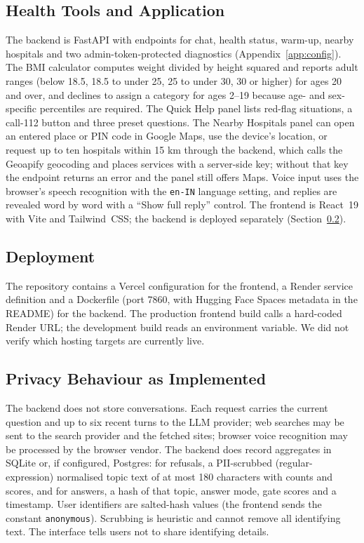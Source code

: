 \documentclass[10pt,a4paper]{article}
\newcommand{\code}[1]{\texttt{\small #1}}
\begin{document}
\subsection{Health Tools and Application}
The backend is FastAPI with endpoints for chat, health status, warm-up, nearby hospitals and two admin-token-protected diagnostics (Appendix~\ref{app:config}). The BMI calculator computes weight divided by height squared and reports adult ranges (below 18.5, 18.5 to under 25, 25 to under 30, 30 or higher) for ages 20 and over, and declines to assign a category for ages 2--19 because age- and sex-specific percentiles are required. The Quick Help panel lists red-flag situations, a call-112 button and three preset questions. The Nearby Hospitals panel can open an entered place or PIN code in Google Maps, use the device's location, or request up to ten hospitals within 15 km through the backend, which calls the Geoapify geocoding and places services with a server-side key; without that key the endpoint returns an error and the panel still offers Maps. Voice input uses the browser's speech recognition with the \code{en-IN} language setting, and replies are revealed word by word with a ``Show full reply'' control. The frontend is React~19 with Vite and Tailwind~CSS; the backend is deployed separately (Section~\ref{sec:deploy}).

\subsection{Deployment}\label{sec:deploy}
The repository contains a Vercel configuration for the frontend, a Render service definition and a Dockerfile (port 7860, with Hugging Face Spaces metadata in the README) for the backend. The production frontend build calls a hard-coded Render URL; the development build reads an environment variable. We did not verify which hosting targets are currently live.

\subsection{Privacy Behaviour as Implemented}\label{sec:privacy}
The backend does not store conversations. Each request carries the current question and up to six recent turns to the LLM provider; web searches may be sent to the search provider and the fetched sites; browser voice recognition may be processed by the browser vendor. The backend does record aggregates in SQLite or, if configured, Postgres: for refusals, a PII-scrubbed (regular-expression) normalised topic text of at most 180 characters with counts and scores, and for answers, a hash of that topic, answer mode, gate scores and a timestamp. User identifiers are salted-hash values (the frontend sends the constant \code{anonymous}). Scrubbing is heuristic and cannot remove all identifying text. The interface tells users not to share identifying details.
\end{document}

